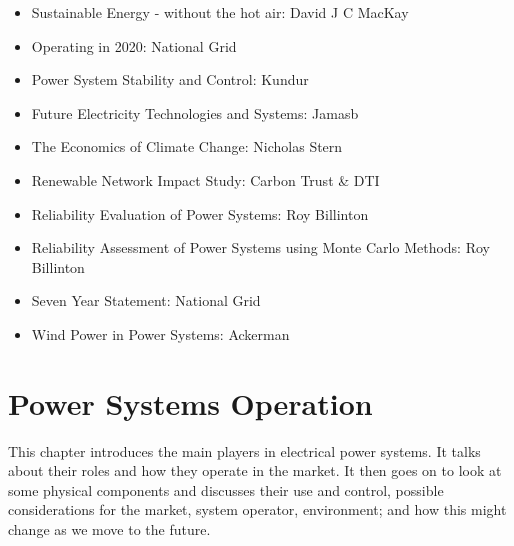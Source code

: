 \documentclass[a4paper,oneside,12pt]{report}
\begin{document}
\begin{itemize}
\item Sustainable Energy - without the hot air: David J C MacKay \cite{MacKay2009}
\item Operating in 2020: National Grid \cite{Grid2009}
\item Power System Stability and Control: Kundur \cite{Kundur1994}
\item Future Electricity Technologies and Systems: Jamasb \cite{Jamasb2006}
\item The Economics of Climate Change: Nicholas Stern \cite{Stern2007}
\item Renewable Network Impact Study: Carbon Trust \& DTI \cite{Trust2005}
\item Reliability Evaluation of Power Systems: Roy Billinton \cite{Billinton1996}
\item Reliability Assessment of Power Systems using Monte Carlo Methods: Roy Billinton \cite{Billinton1994}
\item Seven Year Statement: National Grid \cite{Grid2007}
\item Wind Power in Power Systems: Ackerman \cite{Ackermann2005}
\end{itemize}



















\chapter{Power Systems Operation}

This chapter introduces the main players in electrical power systems. It talks about their roles and how they operate in the market. It then goes on to look at some physical components and discusses their use and control, possible considerations for the market, system operator, environment; and how this might change as we move to the future.
\end{document}
